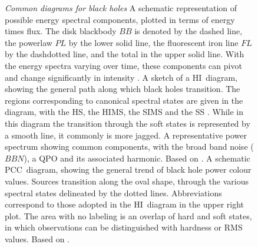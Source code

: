 \begin{landscape}
\begin{figure}[H]
{\begin{minipage}[c]{162pt}
  \label{fig:bh_pc}
  \end{minipage}}
\caption[Common diagrams for black holes]{%
\emph{Common diagrams for black holes}  A schematic representation of possible energy spectral components, plotted in terms of energy times flux. The disk blackbody $BB$ is denoted by the dashed line, the powerlaw $PL$ by the lower solid line, the fluorescent iron line $FL$ by the dashdotted line, and the total in the upper solid line. With the energy spectra varying over time, these components can pivot and change significantly in intensity \citep[for a full review see][]{gilfanov2014observational}. 
 A sketch of a \ac{HI}~diagram, showing the general path along which black holes transition. The regions corresponding to canonical spectral states are given in the diagram, with the \acf{HS}, the \acf{HIMS}, the \acf{SIMS} and the \acf{SS} \citep{altamirano}. While in this diagram the transition through the soft states is represented by a smooth line, it commonly is more jagged.
 A representative power spectrum showing common components, with the broad band noise ($BBN$), a \acf{QPO} and its associated harmonic. Based on \citet{pahari2013comparison}.
 A schematic \ac{PCC}~diagram, showing the general trend of black hole power colour values. Sources transition along the oval shape, through the various spectral states delineated by the dotted lines. Abbreviations correspond to those adopted in the \ac{HI}~diagram in the upper right plot. The area with no labeling is an overlap of hard and soft states, in which observations can be distinguished with hardness or \acf{RMS} values. Based on \citet{heil2015power}.
}\label{fig:bh_graphs}
\end{figure}
\end{landscape}